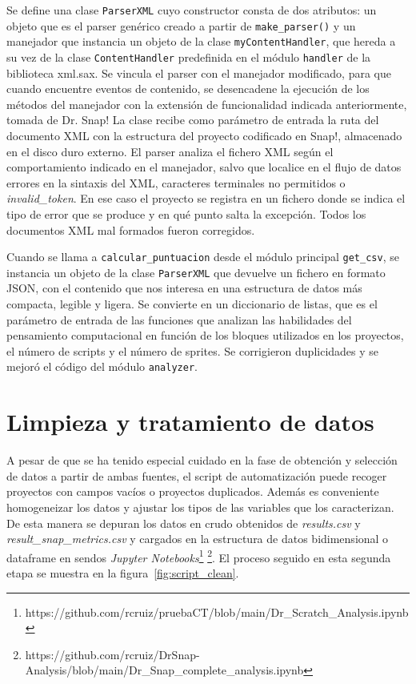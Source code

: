 \documentclass[a4paper, 12pt]{book}
\begin{document}
Se define una clase \texttt{ParserXML} cuyo constructor consta de dos atributos: un objeto que es el parser genérico creado a partir de \texttt{make\_parser()} y un manejador que instancia un objeto de la clase \texttt{myContentHandler}, que hereda a su vez de la clase \texttt{ContentHandler} predefinida en el módulo \texttt{handler} de la biblioteca xml.sax. Se vincula el parser con el manejador modificado, para que cuando encuentre eventos de contenido, se desencadene la ejecución de los métodos del manejador con la extensión de funcionalidad indicada anteriormente, tomada de Dr. Snap! La clase recibe como parámetro de entrada la ruta del documento XML con la estructura del proyecto codificado en Snap!, almacenado en el disco duro externo. El parser analiza el fichero XML según el comportamiento indicado en el manejador, salvo que localice en el flujo de datos errores en la sintaxis del XML, caracteres terminales no permitidos o \emph{invalid\_token}. En ese caso el proyecto se registra en un fichero donde se indica el tipo de error que se produce y en qué punto salta la excepción. Todos los documentos XML mal formados fueron corregidos. 

Cuando se llama a \texttt{calcular\_puntuacion} desde el módulo principal \texttt{get\_csv}, se instancia un objeto de la clase \texttt{ParserXML} que devuelve un fichero en formato JSON, con el contenido que nos interesa en una estructura de datos más compacta, legible y ligera. Se convierte en un diccionario de listas, que es el parámetro de entrada de las funciones que analizan las habilidades del pensamiento computacional en función de los bloques utilizados en los proyectos, el número de scripts y el número de sprites. Se corrigieron duplicidades y se mejoró el código del módulo \texttt{analyzer}.

\section{Limpieza y tratamiento de datos} 
\label{sec:clean_data}

A pesar de que se ha tenido especial cuidado en la fase de obtención y selección de datos a partir de ambas fuentes, el script de automatización puede recoger proyectos con campos vacíos o proyectos duplicados. Además es conveniente homogeneizar los datos y ajustar los tipos de las variables que los caracterizan. De esta manera se depuran los datos en crudo obtenidos de \emph{results.csv} y \emph{result\_snap\_metrics.csv} y cargados en la estructura de datos bidimensional o dataframe en sendos \emph{Jupyter Notebooks}\footnote{https://github.com/rcruiz/pruebaCT/blob/main/Dr\_Scratch\_Analysis.ipynb} \footnote{https://github.com/rcruiz/DrSnap-Analysis/blob/main/Dr\_Snap\_complete\_analysis.ipynb}. El proceso seguido en esta segunda etapa se muestra en la figura~\ref{fig:script_clean}. 
\end{document}
